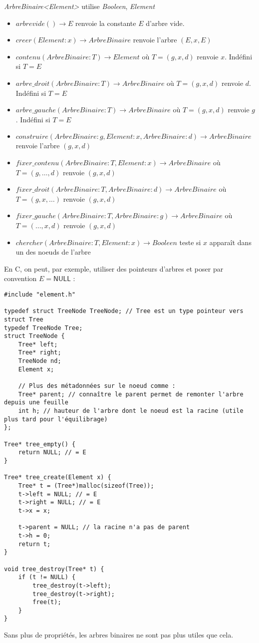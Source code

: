 \documentclass[../../../main.tex]{subfiles}
\begin{document}
\textit{ArbreBinaire\textless{}Element\textgreater} utilise \textit{Booleen}, \textit{Element}
\begin{itemize}
	\item $arbrevide()\rightarrow E$ renvoie la constante $E$ d'arbre vide.
	\item $creer(Element:x) \rightarrow ArbreBinaire$ renvoie l'arbre $(E, x, E)$
	\item $contenu(ArbreBinaire:T)\rightarrow Element$ où $T = (g, x, d)$ renvoie $x$. Indéfini si $T = E$
	\item $arbre\_droit(ArbreBinaire:T)\rightarrow ArbreBinaire$ où $T = (g, x, d)$ renvoie $d$. Indéfini si $T = E$
	\item $arbre\_gauche(ArbreBinaire:T)\rightarrow ArbreBinaire$ où $T = (g, x, d)$ renvoie $g$. Indéfini si $T = E$
	\item $construire(ArbreBinaire:g, Element:x, ArbreBinaire:d)\rightarrow ArbreBinaire$ renvoie l'arbre $(g, x, d)$
	\item $fixer\_contenu(ArbreBinaire:T, Element:x)\rightarrow ArbreBinaire$ où $T = (g, \dots, d)$ renvoie $(g, x, d)$
	\item $fixer\_droit(ArbreBinaire:T, ArbreBinaire:d)\rightarrow ArbreBinaire$ où $T = (g, x, \dots)$ renvoie $(g, x, d)$
	\item $fixer\_gauche(ArbreBinaire:T, ArbreBinaire:g)\rightarrow ArbreBinaire$ où $T = (\dots, x, d)$ renvoie $(g, x, d)$
	\item $chercher(ArbreBinaire:T, Element:x)\rightarrow Booleen$ teste si $x$ apparaît dans un des noeuds de l'arbre
\end{itemize}
En C, on peut, par exemple, utiliser des pointeurs d'arbres et poser par convention $E = \textsf{NULL}$ :
\begin{verbatim}
#include "element.h"

typedef struct TreeNode TreeNode; // Tree est un type pointeur vers struct Tree
typedef TreeNode Tree;
struct TreeNode {
	Tree* left;
	Tree* right;
	TreeNode nd;
	Element x;

	// Plus des métadonnées sur le noeud comme :
	Tree* parent; // connaître le parent permet de remonter l'arbre depuis une feuille
	int h; // hauteur de l'arbre dont le noeud est la racine (utile plus tard pour l'équilibrage)
};

Tree* tree_empty() {
	return NULL; // = E
}

Tree* tree_create(Element x) {
	Tree* t = (Tree*)malloc(sizeof(Tree));
	t->left = NULL; // = E
	t->right = NULL; // = E
	t->x = x;

	t->parent = NULL; // la racine n'a pas de parent
	t->h = 0;
	return t;
}

void tree_destroy(Tree* t) {
	if (t != NULL) {
		tree_destroy(t->left);
		tree_destroy(t->right);
		free(t);
	}
}
\end{verbatim}
Sans plus de propriétés, les arbres binaires ne sont pas plus utiles que cela.
\end{document}
